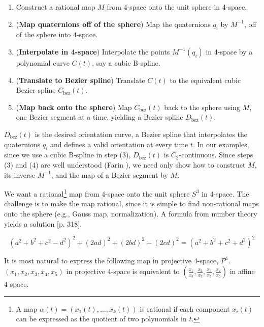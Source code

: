 \begin{enumerate}
\item
	Construct a rational map $M$ from 4-space onto the unit sphere in 
	4-space.
\item
	({\bf Map quaternions off of the sphere})
	Map the quaternions $q_i$ by $M^{-1}$,
	off of the sphere into 4-space.
\item
	({\bf Interpolate in 4-space})
	Interpolate the points $M^{-1}(q_i)$ in 4-space
	by a polynomial curve $C(t)$, say a cubic B-spline.
\item
	({\bf Translate to Bezier spline})
	Translate $C(t)$ to the equivalent cubic Bezier spline 
	$C_{\mbox{bez}}(t)$.
\item
	({\bf Map back onto the sphere})
	Map $C_{\mbox{bez}}(t)$ back to the sphere using $M$, 
	one Bezier segment at a time, yielding a  
	Bezier spline $D_{\mbox{bez}}(t)$. 
\end{enumerate}

$D_{\mbox{bez}}(t)$ is the desired orientation curve, a Bezier spline
that interpolates the quaternions $q_i$ and defines a valid orientation
at every time $t$.
In our examples, since we use a cubic B-spline in step (3),
$D_{\mbox{bez}}(t)$ is $C_2$-continuous.
Since steps (3) and (4) are well understood (Farin \cite{farin93}),
we need only show how to construct $M$, its inverse $M^{-1}$,
and the map of a Bezier segment by $M$.

We want a rational\footnote{A map $\alpha(t) = (x_1(t),\ldots,x_k(t))$
	is rational if each component $x_i(t)$ can be expressed
	as the quotient of two polynomials in $t$.}
map from 4-space onto the unit sphere $S^3$ in
4-space.
The challenge is to make the map rational,
since it is simple to find non-rational maps onto the sphere 
(e.g., Gauss map, normalization).
A formula from number theory yields a solution
\cite{dickson52}[p. 318].

\begin{lemma}
\begin{equation}
\label{eqn:aida}
(a^2 + b^2 + c^2 - d^2)^2 + (2ad)^2 + (2bd)^2 + (2cd)^2 = 
(a^2 + b^2 + c^2 + d^2)^2
\end{equation}
\end{lemma}

It is most natural to express the following map in projective 4-space, $P^4$.
$(x_1,x_2,x_3,x_4,x_5)$ in projective 4-space is equivalent to
$(\frac{x_1}{x_5},\frac{x_2}{x_5},\frac{x_3}{x_5},\frac{x_4}{x_5})$ 
in affine 4-space.

